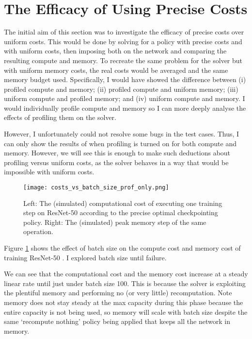 \section{The Efficacy of Using Precise Costs}
The initial aim of this section was to investigate the efficacy of precise costs over uniform costs.
This would be done by solving for a policy with precise costs and with uniform costs, then imposing both on the network and comparing the resulting compute and memory.
To recreate the same problem for the solver but with uniform memory costs, the real costs would be averaged and the same memory budget used.
Specifically, I would have showed the difference between (i) profiled compute and memory; (ii) profiled compute and uniform memory; (iii) uniform compute and profiled memory; and (iv) uniform compute and memory.
I would individually profile compute and memory so I can more deeply analyse the effects of profiling them on the solver.

However, I unfortunately could not resolve some bugs in the test cases.
Thus, I can only show the results of when profiling is turned on for both compute and memory.
However, we will see this is enough to make such deductions about profiling versus uniform costs, as the solver behaves in a way that would be impossible with uniform costs.

\begin{figure}[th]
    \centering
    \texttt{[image: costs\_vs\_batch\_size\_prof\_only.png]}
    \caption{Left: The (simulated) computational cost of executing one training step on ResNet-50 according to the precise optimal checkpointing policy. Right: The (simulated) peak memory step of the same operation.}
    \label{fig:3-prof-results}
\end{figure}

Figure \ref{fig:3-prof-results} shows the effect of batch size on the compute cost and memory cost of training ResNet-50 \cite{He2016-resnet}.
I explored batch size until failure.

We can see that the computational cost and the memory cost increase at a steady linear rate until just under batch size 100.
This is because the solver is exploiting the plentiful memory and performing no (or very little) recomputation.
Note memory does not stay steady at the max capacity during this phase because the entire capacity is not being used,
so memory will scale with batch size despite the same `recompute nothing' policy being applied that keeps all the network in memory.

